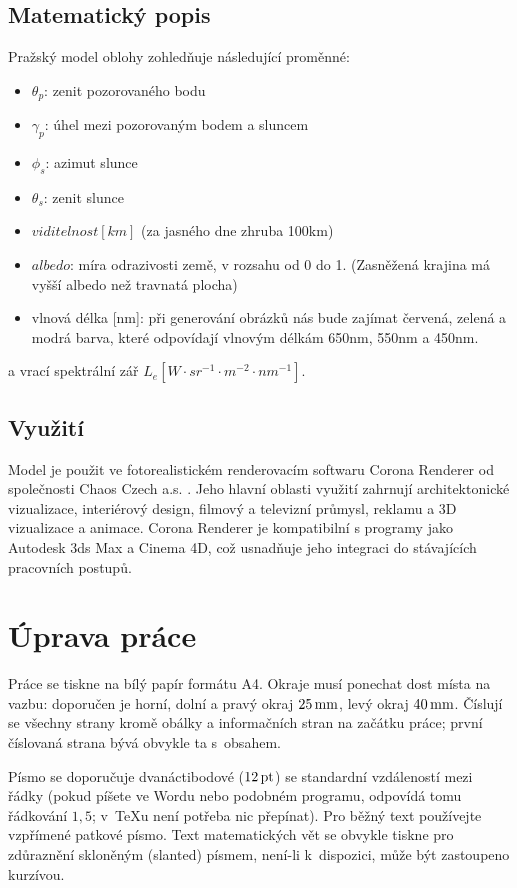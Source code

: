 \subsection{Matematický popis}
Pražský model oblohy zohledňuje následující proměnné: 
\begin{itemize}
  \item $\theta_p$: zenit pozorovaného bodu
  \item $\gamma_p$: úhel mezi pozorovaným bodem a sluncem
  \item $\phi_s$: azimut slunce
  \item $\theta_s$: zenit slunce
  \item $viditelnost[km]$ (za jasného dne zhruba 100km)
  \item $albedo$: míra odrazivosti země, v rozsahu od 0 do 1. (Zasněžená krajina má vyšší albedo než travnatá plocha)
  \item vlnová délka [nm]: při generování obrázků nás bude zajímat červená, zelená a modrá barva, které odpovídají vlnovým délkám 650nm, 550nm a 450nm. 
\end{itemize}
a vrací spektrální zář  $L_e [W \cdot sr^{-1} \cdot m^{-2} \cdot nm^{-1}]$.
\subsection{Využití}
Model je použit ve fotorealistickém renderovacím softwaru Corona Renderer od společnosti Chaos Czech a.s. \citep{corona}. 
Jeho hlavní oblasti využití zahrnují architektonické vizualizace, interiérový design, filmový a televizní průmysl, reklamu a 3D vizualizace a animace. Corona Renderer je kompatibilní s programy jako Autodesk 3ds Max a Cinema 4D, což usnadňuje jeho integraci do stávajících pracovních postupů.

\section{Úprava práce}


Práce se tiskne na bílý papír formátu A4. Okraje musí ponechat dost místa na vazbu:
doporučen je horní, dolní a pravý okraj $25\,\rm mm$, levý okraj $40\,\rm mm$.
Číslují se všechny strany kromě obálky a informačních stran na začátku práce;
první číslovaná strana bývá obvykle ta s~obsahem.

Písmo se doporučuje dvanáctibodové ($12\,\rm pt$) se standardní vzdáleností mezi řádky
(pokud píšete ve Wordu nebo podobném programu, odpovídá tomu řádkování $1,5$; v~\TeX{}u
není potřeba nic přepínat). Pro běžný text používejte vzpřímené patkové písmo.
Text matematických vět se obvykle tiskne pro zdůraznění skloněným (slanted) písmem,
není-li k~dispozici, může být zastoupeno kurzívou.

